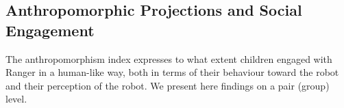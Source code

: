 \documentclass{sig-alternate}
\begin{document}
\subsection{Anthropomorphic Projections and Social Engagement}

The anthropomorphism index expresses to what extent children engaged with Ranger
in a human-like way, both in terms of their behaviour toward the robot and their
perception of the robot. We present here findings on a pair (group) level.

\end{document}
